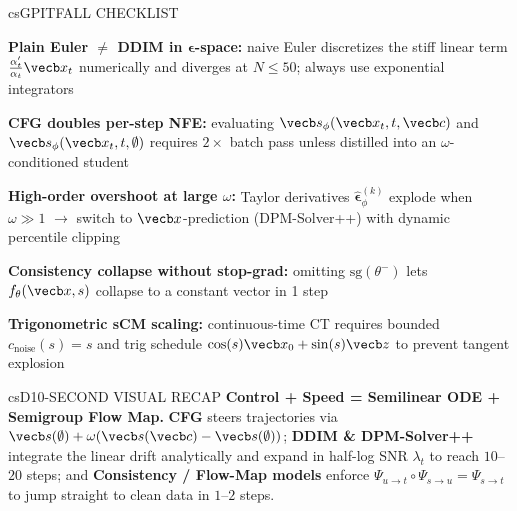 \documentclass[../../../../master.tex]{subfiles}
\begin{document}
\begin{cscolumns}
\begin{cscard}{csG}{PITFALL CHECKLIST}
  \begin{csbul}
    \item \textbf{Plain Euler $\ne$ DDIM in $\boldsymbol\epsilon$-space:} naive Euler discretizes the stiff linear term $\frac{\alpha_t'}{\alpha_t}\vecb x_t$ numerically and diverges at $N\le 50$; always use exponential integrators
    \item \textbf{CFG doubles per-step NFE:} evaluating $\vecb s_\phi(\vecb x_t,t,\vecb c)$ and $\vecb s_\phi(\vecb x_t,t,\emptyset)$ requires $2\times$ batch pass unless distilled into an $\omega$-conditioned student
    \item \textbf{High-order overshoot at large $\omega$:} Taylor derivatives $\hat{\boldsymbol\epsilon}_\phi^{(k)}$ explode when $\omega\gg 1$ $\to$ switch to $\vecb x$-prediction (DPM-Solver++) with dynamic percentile clipping
    \item \textbf{Consistency collapse without stop-grad:} omitting $\mathrm{sg}(\theta^-)$ lets $f_\theta(\vecb x,s)$ collapse to a constant vector in 1 step
    \item \textbf{Trigonometric sCM scaling:} continuous-time CT requires bounded $c_{\mathrm{noise}}(s)=s$ and trig schedule $\cos(s)\vecb x_0+\sin(s)\vecb z$ to prevent tangent explosion
  \end{csbul}
\end{cscard}

\begin{cscard}{csD}{10-SECOND VISUAL RECAP}
  \sffamily\footnotesize
  \textbf{Control + Speed = Semilinear ODE + Semigroup Flow Map.}
  \textbf{CFG} steers trajectories via $\vecb s(\emptyset)+\omega(\vecb s(\vecb c)-\vecb s(\emptyset))$; \textbf{DDIM \& DPM-Solver++} integrate the linear drift analytically and expand in half-log SNR $\lambda_t$ to reach $10$--$20$ steps; and \textbf{Consistency / Flow-Map models} enforce $\Psi_{u\to t}\circ\Psi_{s\to u}=\Psi_{s\to t}$ to jump straight to clean data in $1$--$2$ steps.
\end{cscard}
\end{cscolumns}

\csend
\end{document}
